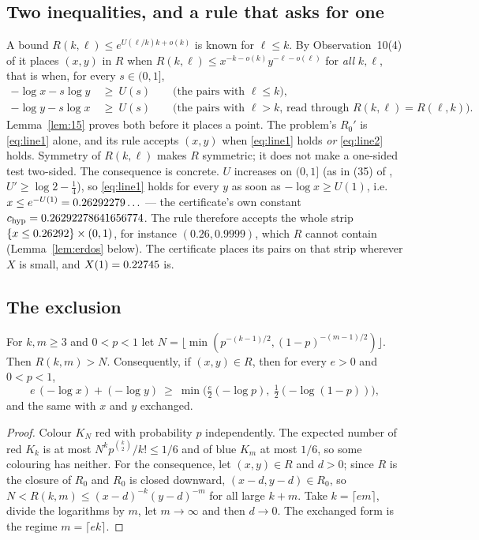 \documentclass[11pt]{article}
\newcommand{\Rz}{R_0}
\begin{document}
\subsection{Two inequalities, and a rule that asks for one}

A bound $R(k,\ell)\le e^{U(\ell/k)k+o(k)}$ is known for $\ell\le k$. By Observation~10(4) of \cite{GNNW} it places $(x,y)$ in $R$ when $R(k,\ell)\le x^{-k-o(k)}y^{-\ell-o(\ell)}$ for \emph{all} $k,\ell$, that is when, for every $s\in(0,1]$,
\begin{align}
-\log x-s\log y&\ \ge\ U(s)\qquad\text{(the pairs with $\ell\le k$),}\label{eq:line1}\\
-\log y-s\log x&\ \ge\ U(s)\qquad\text{(the pairs with $\ell>k$, read through $R(k,\ell)=R(\ell,k)$).}\label{eq:line2}
\end{align}
Lemma~\ref{lem:15} proves both before it places a point. The problem's $\Rz'$ is \eqref{eq:line1} alone, and its rule accepts $(x,y)$ when \eqref{eq:line1} holds \emph{or} \eqref{eq:line2} holds. Symmetry of $R(k,\ell)$ makes $R$ symmetric; it does not make a one-sided test two-sided. The consequence is concrete. $U$ increases on $(0,1]$ (as in (35) of \cite{GNNW}, $U'\ge\log2-\tfrac14$), so \eqref{eq:line1} holds for every $y$ as soon as $-\log x\ge U(1)$, i.e.\ $x\le e^{-U(1)}=0.26292279\ldots$ --- the certificate's own constant $c_{\mathrm{hyp}}=0.26292278641656774$. The rule therefore accepts the whole strip $\{x\le0.26292\}\times(0,1)$, for instance $(0.26,0.9999)$, which $R$ cannot contain (Lemma~\ref{lem:erdos} below). The certificate places its pairs on that strip wherever $X$ is small, and $X(1)=0.22745$ is.

\subsection{The exclusion}

\begin{lemma}\label{lem:erdos}
For $k,m\ge3$ and $0<p<1$ let $N=\lfloor\min(p^{-(k-1)/2},(1-p)^{-(m-1)/2})\rfloor$. Then $R(k,m)>N$. Consequently, if $(x,y)\in R$, then for every $e>0$ and $0<p<1$,
\[
e\,(-\log x)+(-\log y)\ \ge\ \min\bigl(\tfrac e2(-\log p),\ \tfrac12(-\log(1-p))\bigr),
\]
and the same with $x$ and $y$ exchanged.
\end{lemma}
\begin{proof}
Colour $K_N$ red with probability $p$ independently. The expected number of red $K_k$ is at most $N^kp^{\binom k2}/k!\le1/6$ and of blue $K_m$ at most $1/6$, so some colouring has neither. For the consequence, let $(x,y)\in R$ and $d>0$; since $R$ is the closure of $\Rz$ and $\Rz$ is closed downward, $(x-d,y-d)\in\Rz$, so $N<R(k,m)\le(x-d)^{-k}(y-d)^{-m}$ for all large $k+m$. Take $k=\lceil em\rceil$, divide the logarithms by $m$, let $m\to\infty$ and then $d\to0$. The exchanged form is the regime $m=\lceil ek\rceil$.
\end{proof}
\end{document}
